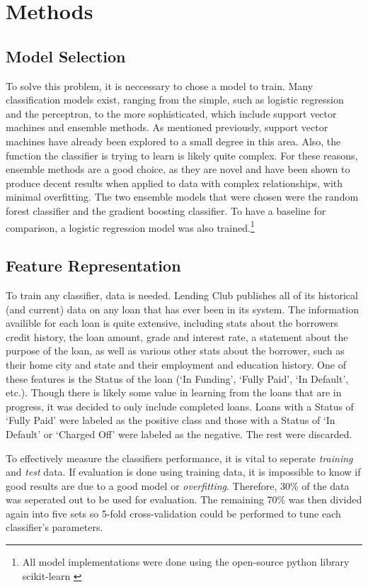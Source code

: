 \section{Methods}
\label{methods}
\subsection{Model Selection}
\label{methods.models}
To solve this problem, it is neccessary to chose a model to train. Many classification models exist, ranging from the simple, 
such as logistic regression and the perceptron, to the more sophisticated, which include support vector machines and ensemble
methods. As mentioned previously, support vector machines have already been explored to a small degree in this area. Also, 
the function the classifier is trying to learn is likely quite complex. For these reasons, ensemble methods are a good choice, 
as they are novel and have been shown to produce decent results when applied to data with complex relationships, with minimal overfitting.
The two ensemble models that were chosen were the random forest classifier and the gradient boosting classifier. To have a 
baseline for comparison, a logistic regression model was also trained.\footnote{All model implementations were done 
using the open-source python library scikit-learn \cite{scikit-learn}}
\subsection{Feature Representation}
\label{methods.features}
To train any classifier, data is needed. Lending Club publishes all of its historical (and current) data on any loan 
that has ever been in its system. The information availible for each loan is quite extensive, including stats about the 
borrowers credit history, the loan amount, grade and interest rate, a statement about the purpose of the loan, as well as 
various other stats about the borrower, such as their home city and state and their employment and education history. One 
of these features is the Status of the loan (`In Funding', `Fully Paid', `In Default', etc.). Though there is likely some 
value in learning from the loans that are in progress, it was decided to only include completed loans. Loans with a Status 
of `Fully Paid' were labeled as the positive class and those with a Status of `In Default' or `Charged Off' were 
labeled as the negative. The rest were discarded. 

To effectively measure the classifiers performance, it is vital to seperate \emph{training} and \emph{test} data. If evaluation 
is done using training data, it is impossible to know if good results are due to a good model or \emph{overfitting}. 
Therefore, 30\% of the data was seperated out to be used for evaluation. The remaining 70\% was then divided again into 
five sets so 5-fold cross-validation could be performed to tune each classifier's parameters.


